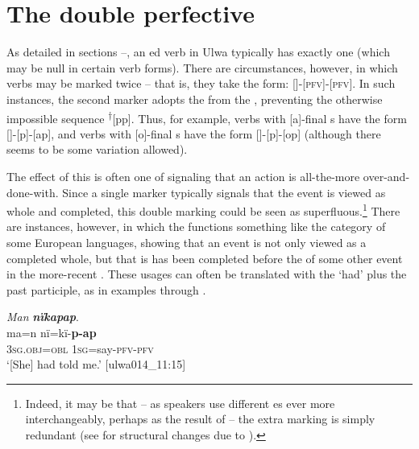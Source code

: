 \section{The double perfective}\label{sec:4.8}


As detailed in sections --, an ed verb in Ulwa typically has exactly one   (which may be  null in certain  verb forms). There are circumstances, however, in which  verbs may be marked twice -- that is, they take the form: []-[\textsc{pfv}]-[\textsc{pfv}]. In such instances, the second  marker adopts the  from the , preventing the otherwise impossible sequence \textsuperscript{†}[pp]. Thus, for example, verbs with [a]-final s have the form []-[p]-[ap], and verbs with [o]-final s have the form []-[p]-[op] (although there seems to be some variation allowed).

  The  effect of this  is often one of signaling that an action is all-the-more over-and-done-with. Since a single  marker typically signals that the event is viewed as whole and completed, this double marking could be seen as superfluous.\footnote{Indeed, it may be that -- as speakers use different  es ever more interchangeably, perhaps as the result of  -- the extra  marking is simply redundant (see  for structural changes due to ).} There are instances, however, in which the  functions something like the  category of some European languages, showing that an event is not only viewed as a completed whole, but that is has been completed before the  of some other event in the more-recent . These usages can often be translated with the   ‘had’ plus the past participle, as in examples  through .



\ea%
    \label{ex:verbs:41}
          \textit{Man} \textbf{\textit{nïkapap}}.\\
\gll ma=n      nï=kï{}-\textbf{p-ap}\\
    3\textsc{sg.obj=obl}  1\textsc{sg}=say-\textsc{pfv}{}-\textsc{pfv}\\
\glt `[She] had told me.’ [ulwa014\_11:15]
\z

